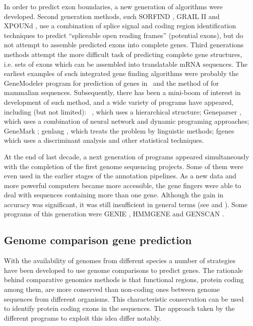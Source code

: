 In order to predict exon boundaries, a new generation of algorithms
were developed. Second generation methods, such SORFIND
\citep{xu:1994a}, GRAIL II \citep{hutchinson:1992a} and XPOUNd
\citep{thomas:1994a}, use a combination of splice signal and coding region
identification techniques to predict ``spliceable open reading
frames'' (potential exons), but do not attempt to assemble predicted
exons into complete genes. Third generations methods attempt the more
difficult task of predicting complete gene structures, i.e. sets of
exons which can be assembled into translatable mRNA sequences. The
earliest examples of such integrated gene finding algorithms were
probably the GeneModeler program \citep{fields:1990a} for prediction
of genes in \Ce\ and the method of \citep{gelfand:1990a} for
mammalian sequences. Subsequently, there has been a mini-boom of
interest in development of such method, and a wide variety of programs
have appeared, including (but not limited): \geneid\
\citep{guigo:1992a}, which uses a hierarchical structure; Geneparser
\citep{snyder:1993a}, which uses a combination of neural network and dynamic
programing approaches; GeneMark \citep{borodovsky:1993a}; genlang
\citep{dong:1994a}, which treats the problem by linguistic methods;
fgenes \citep{solovyev:1994a} which uses a discriminant analysis and
other statistical techniques.


At the end of last decade, a next generation of programs appeared
simultaneously with the completion of the first genome sequencing
projects. Some of them were even used in the earlier stages of the
annotation pipelines. As a new data and more powerful computers became
more accessible, the gene fingers were able to deal with sequences
containing more than one gene. Although the gain in accuracy was
significant, it was still insufficient in general terms (see
\cite{guigo:2000a} and \cite{rogic:2001a}). Some programs of this
generation were GENIE \citep{kulp:1996a}, HMMGENE \citep{krogh:1997a}
and GENSCAN \citep{burge:1997a}.


\subsection{Genome comparison gene prediction}

With the availability of genomes from different species a number of
strategies have been developed to use genome comparisons to predict
genes. The rationale behind comparative genomics methods is that
functional regions, protein coding among them, are more conserved than
non-coding ones between genome sequences from different organisms. This
characteristic conservation can be used to identify protein coding
exons in the sequences. The approach taken by the different programs to
exploit this idea differ notably.

